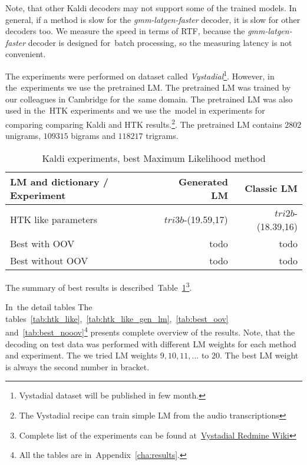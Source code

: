 {Note, that other Kaldi decoders may not support some of the trained models.
In general, if a method is slow for the {\it gmm-latgen-faster} decoder, it is slow for other decoders too.
We measure the speed in terms of \ac{RTF}, because the {\it gmm-latgen-faster} decoder is designed for~batch 
processing, so the measuring latency is not convenient.


The experiments were performed on dataset called {\it Vystadial}\footnote{Vystadial dataset will be published in few month.}.
However, in the~experiments we use the pretrained \ac{LM}.
The pretrained \acl{LM} was trained by our colleagues in Cambridge for the~same domain.
The pretrained \ac{LM} was also used in the~\ac{HTK} experiments and we use the~model in experiments 
for comparing comparing Kaldi and \ac{HTK} results.\footnote{The Vystadial recipe can train simple \ac{LM} from the audio transcriptions}.
The pretrained \ac{LM} contains $2802$ unigrams, $109315$ bigrams and
$118217$ trigrams. 


\begin{table}[!htp]\label{tab:exp_best}
\begin{tabular}{lrr}
\hline
\parbox[t]{6.0cm}{\ac{LM} and dictionary / Experiment} & Generated \acs{LM}  & Classic \ac{LM} \\
\hline
\ac{HTK} like parameters    &  $tri3b$-(19.59,17) & $tri2b$-(18.39,16) \\
Best with OOV               & todo & todo \\
Best without OOV            & todo & todo \\
\hline
\end{tabular}
\caption{Kaldi experiments, best Maximum Likelihood method}
\end{table}

The summary of best results is described~Table~\ref{tab:exp_best}\footnote{ 
Complete list of the experiments can be found 
at~\href{https://redmine.ms.mff.cuni.cz/projects/Vystadial/wiki/Acoustic_models/}{Vystadial Redmine Wiki}}. 

In~the detail tables 
The tables~\ref{tab:htk_like},~\ref{tab:htk_like_gen_lm},~\ref{tab:best_oov} 
and~\ref{tab:best_nooov}\footnote{All the tables are in~Appendix~\ref{cha:results}.} presents complete overview of the results. 
Note, that the decoding on test data was performed with different \ac{LM} weights for each method and 
experiment. The we tried \ac{LM} weights $9, 10, 11, ...$ to $20$. 
The best \ac{LM} weight is always the second number in bracket.

}

